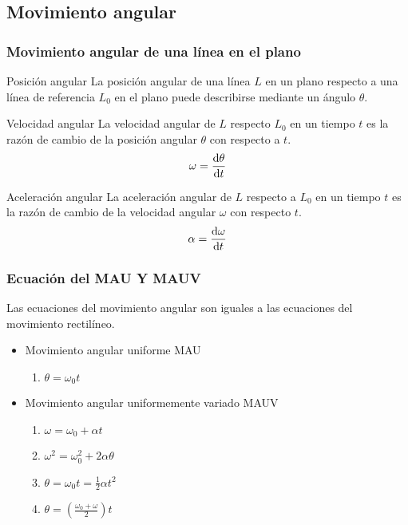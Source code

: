 \subsection*{Movimiento angular}
\subsubsection*{Movimiento angular de una línea en el plano}
\begin{Theorem*} {Posición angular}
	La posición angular de una línea $L$ en un plano respecto a una línea de referencia $L_0$ en el plano puede describirse mediante un ángulo $\theta$.
\end{Theorem*}
\begin{Theorem*} {Velocidad angular}
	La velocidad angular de $L$ respecto $L_0$ en un tiempo $t$ es la razón de cambio de la posición angular $\theta$ con respecto a $t$.
	$$ \omega = \dv{\theta}{t} $$
\end{Theorem*}
\begin{Theorem*} {Aceleración angular}
	La aceleración angular de $L$ respecto a $L_0$ en un tiempo $t$ es la razón de cambio de la velocidad angular $\omega$ con respecto $t$.
	$$ \alpha =\dv{\omega}{t} $$
\end{Theorem*}
\subsubsection*{Ecuación del MAU Y MAUV}
Las ecuaciones del movimiento angular son iguales a las ecuaciones del movimiento rectilíneo.
\begin{itemize}
	\item Movimiento angular uniforme MAU
	\begin{enumerate}
		\item $ \theta = \omega_0 t $
	\end{enumerate}
	\item Movimiento angular uniformemente variado MAUV
	\begin{enumerate}
		\item $\omega=\omega_0+\alpha t$
		\item $ \omega^2=\omega_0^2+2\alpha \theta $
		\item $\theta=\omega_0t=\frac{1}{2}\alpha t^2$
		\item $\theta=\left(\frac{\omega_0+\omega}{2}\right)t$
	\end{enumerate}
\end{itemize}
